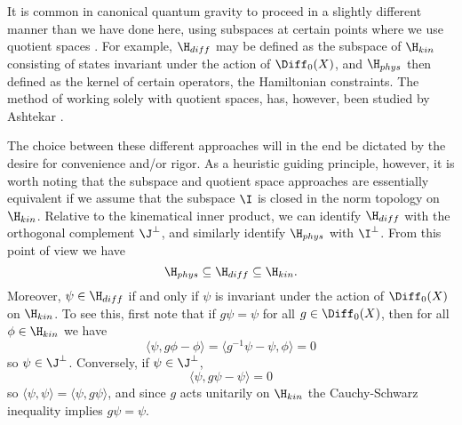 It is common in canonical quantum gravity to proceed in a slightly
different manner than we have done here, using subspaces at certain points
where we use quotient spaces \cite{RS,RS2}. For example, $\H_{diff}$ may be
defined as the subspace of $\H_{kin}$ consisting of states invariant under
the action of $\Diff_0(X)$, and $\H_{phys}$ then defined as the kernel of
certain operators, the Hamiltonian constraints.   The method of working
solely with quotient spaces, has, however, been studied by Ashtekar
\cite{Ash}.

The choice between these different approaches will in the end be
dictated by the desire for convenience and/or rigor.  As a heuristic
guiding principle, however, it is worth noting that
the subspace and quotient space approaches are essentially equivalent if
we assume that the subspace $\I$ is closed in the norm topology on
$\H_{kin}$.   Relative to the kinematical inner product, we can identify
$\H_{diff}$ with the orthogonal complement $\J^\perp$, and similarly identify
$\H_{phys}$ with $\I^\perp$.  From this point of
view we have
\[             \H_{phys} \subseteq \H_{diff} \subseteq \H_{kin}  .\]
Moreover, $\psi \in
\H_{diff}$ if and only if $\psi$ is invariant under the action of
$\Diff_0(X)$ on $\H_{kin}$.
To see this, first note that if $g\psi = \psi$ for all $g\in
\Diff_0(X)$, then for all $\phi \in \H_{kin}$ we have
\[         \langle \psi, g\phi - \phi \rangle =
\langle g^{-1}\psi - \psi, \phi \rangle = 0 \]
so $\psi \in \J^{\perp}$.   Conversely, if $\psi \in \J^\perp$,
\[        \langle \psi, g\psi - \psi\rangle = 0 \]
so $\langle \psi,\psi \rangle = \langle\psi,g\psi \rangle$, and since
$g$ acts unitarily on $\H_{kin}$ the Cauchy-Schwarz inequality implies
$g\psi = \psi$.

